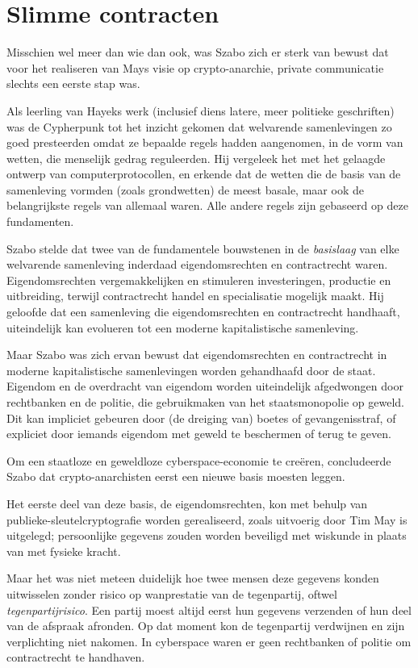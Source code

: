\documentclass[
  a5paper,
  smalldemyvopaper,11pt,twoside,onecolumn,openright,extrafontsizes,
hidelinks]{memoir}
\begin{document}
\section{Slimme contracten}\label{slimme-contracten}

Misschien wel meer dan wie dan ook, was Szabo zich er sterk van bewust
dat voor het realiseren van Mays visie op crypto-anarchie, private
communicatie slechts een eerste stap was.

Als leerling van Hayeks werk (inclusief diens latere, meer politieke
geschriften) was de Cypherpunk tot het inzicht gekomen dat welvarende
samenlevingen zo goed presteerden omdat ze bepaalde regels hadden
aangenomen, in de vorm van wetten, die menselijk gedrag reguleerden. Hij
vergeleek het met het gelaagde ontwerp van computerprotocollen, en
erkende dat de wetten die de basis van de samenleving vormden (zoals
grondwetten) de meest basale, maar ook de belangrijkste regels van
allemaal waren. Alle andere regels zijn gebaseerd op deze fundamenten.

Szabo stelde dat twee van de fundamentele bouwstenen in de
\emph{basislaag} van elke welvarende samenleving inderdaad
eigendomsrechten en contractrecht waren. Eigendomsrechten
vergemakkelijken en stimuleren investeringen, productie en uitbreiding,
terwijl contractrecht handel en specialisatie mogelijk maakt. Hij
geloofde dat een samenleving die eigendomsrechten en contractrecht
handhaaft, uiteindelijk kan evolueren tot een moderne kapitalistische
samenleving.

Maar Szabo was zich ervan bewust dat eigendomsrechten en contractrecht
in moderne kapitalistische samenlevingen worden gehandhaafd door de
staat. Eigendom en de overdracht van eigendom worden uiteindelijk
afgedwongen door rechtbanken en de politie, die gebruikmaken van het
staatsmonopolie op geweld. Dit kan impliciet gebeuren door (de dreiging
van) boetes of gevangenisstraf, of expliciet door iemands eigendom met
geweld te beschermen of terug te geven.

Om een staatloze en geweldloze cyberspace-economie te creëren,
concludeerde Szabo dat crypto-anarchisten eerst een nieuwe basis moesten
leggen.

Het eerste deel van deze basis, de eigendomsrechten, kon met behulp van
publieke-sleutelcryptografie worden gerealiseerd, zoals uitvoerig door
Tim May is uitgelegd; persoonlijke gegevens zouden worden beveiligd met
wiskunde in plaats van met fysieke kracht.

Maar het was niet meteen duidelijk hoe twee mensen deze gegevens konden
uitwisselen zonder risico op wanprestatie van de tegenpartij, oftwel
\emph{tegenpartijrisico}. Een partij moest altijd eerst hun gegevens
verzenden of hun deel van de afspraak afronden. Op dat moment kon de
tegenpartij verdwijnen en zijn verplichting niet nakomen. In cyberspace
waren er geen rechtbanken of politie om contractrecht te handhaven.
\end{document}
